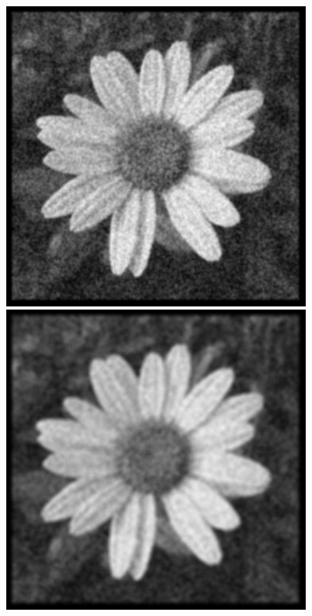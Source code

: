\documentclass[a4paper]{report}
\begin{document}
\begin{figure}[H]
\centering
\begin{minipage}{.5\textwidth}
  \centering
    \includegraphics[width=0.9\textwidth]{images/Canny/flowerSigma0.8.png}
\end{minipage}%
\begin{minipage}{.5\textwidth}
  \centering
  \includegraphics[width=0.9\textwidth]{images/Canny/flowerSigma1.8.png}
\end{minipage}
\end{figure}
\end{document}
